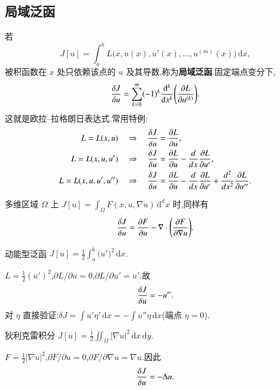 \subsection{局域泛函}
若
\begin{equation}
  J[u]=\int_a^b L\bigl(x,u(x),u'(x),\ldots,u^{(m)}(x)\bigr)\,\mathrm{d}x,
\end{equation}
被积函数在 $x$ 处只依赖该点的 $u$ 及其导数,称为\textbf{局域泛函}.固定端点变分下,
\begin{equation}
  \frac{\delta {J}}{\delta {u}}
  =\sum_{k=0}^{m}(-1)^k\frac{\mathrm{d}^k}{\mathrm{d}x^k}
    \Biggl(\frac{\partial{L}}{\partial{u^{(k)}}}\Biggr).
  \label{eq:fd-local}
\end{equation}
这就是欧拉--拉格朗日表达式.常用特例:
\begin{align}
  L=L(x,u)
  &\quad\Rightarrow\quad
  \frac{\delta {J}}{\delta {u}}=\frac{\partial{L}}{\partial{u}},
  \\
  L=L(x,u,u')
  &\quad\Rightarrow\quad
  \frac{\delta {J}}{\delta {u}}=\frac{\partial{L}}{\partial{u}}-\frac{d{}}{d{x}}\frac{\partial{L}}{\partial{u'}},
  \\
  L=L(x,u,u',u'')
  &\quad\Rightarrow\quad
  \frac{\delta {J}}{\delta {u}}
  =\frac{\partial{L}}{\partial{u}}
  -\frac{d{}}{d{x}}\frac{\partial{L}}{\partial{u'}}
  +\frac{d{^2}}{d{x^2}}\frac{\partial{L}}{\partial{u''}}.
\end{align}

多维区域 $\Omega$ 上 $J[u]=\int_{\Omega}F(x,u,\nabla u)\,\mathrm{d}^dx$ 时,同样有
\begin{equation}
  \frac{\delta {J}}{\delta {u}}
  =\frac{\partial{F}}{\partial{u}}-\nabla\cdot\Biggl(\frac{\partial{F}}{\partial{\nabla u}}\Biggr).
\end{equation}

\begin{example}
动能型泛函 $J[u]=\frac12\int_a^b\bigl(u'\bigr)^2\,\mathrm{d}x$.
\end{example}
\begin{solution}
$L=\frac12(u')^2$,$\partial L/\partial u=0$,$\partial L/\partial u'=u'$.故
\begin{equation}
  \frac{\delta {J}}{\delta {u}}=-u''.
\end{equation}
对 $\eta$ 直接验证:$\delta J=\int u'\eta'\,\mathrm{d}x=-\int u''\eta\,\mathrm{d}x$(端点 $\eta=0$).
\end{solution}

\begin{example}
狄利克雷积分 $J[u]=\frac12\iint_{\Omega}|\nabla u|^2\,\mathrm{d}x\,\mathrm{d}y$.
\end{example}
\begin{solution}
$F=\frac12|\nabla u|^2$,$\partial F/\partial u=0$,$\partial F/\partial\nabla u=\nabla u$.因此
\begin{equation}
  \frac{\delta {J}}{\delta {u}}=-\Delta u.
\end{equation}
\end{solution}

